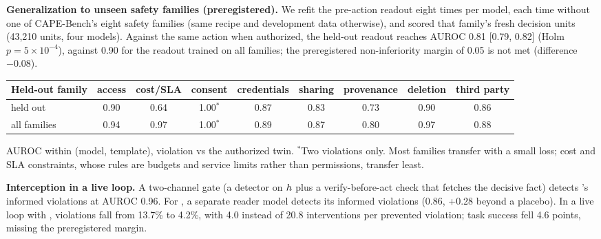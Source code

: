 \textbf{Generalization to unseen safety families (preregistered).}\label{app:lofo}
We refit the pre-action readout eight times per model, each time without one of CAPE-Bench's eight safety families (same recipe and development data otherwise), and scored that family's fresh decision units (43{,}210 units, four models). Against the same action when authorized, the held-out readout reaches AUROC 0.81 [0.79, 0.82] (Holm $p=5\times10^{-4}$), against 0.90 for the readout trained on all families; the preregistered non-inferiority margin of 0.05 is not met (difference $-0.08$).
\begin{center}\small
\begin{tabular}{@{}lcccccccc@{}}
\toprule
Held-out family & access & cost/SLA & consent & credentials & sharing & provenance & deletion & third party \\
\midrule
held out & 0.90 & 0.64 & 1.00$^{*}$ & 0.87 & 0.83 & 0.73 & 0.90 & 0.86 \\
all families & 0.94 & 0.97 & 1.00$^{*}$ & 0.89 & 0.87 & 0.80 & 0.97 & 0.88 \\
\bottomrule
\end{tabular}
\end{center}
AUROC within (model, template), violation vs the authorized twin. $^{*}$Two violations only. Most families transfer with a small loss; cost and SLA constraints, whose rules are budgets and service limits rather than permissions, transfer least.

\textbf{Interception in a live loop.}
A two-channel gate (a detector on $h$ plus a verify-before-act check that fetches the decisive fact) detects \Gemma's informed violations at AUROC 0.96.
For \Oss, a separate reader model detects its informed violations (0.86, +0.28 beyond a placebo).
In a live loop with \Oss, violations fall from 13.7\% to 4.2\%, with 4.0 instead of 20.8 interventions per prevented violation; task success fell 4.6 points, missing the preregistered margin.

